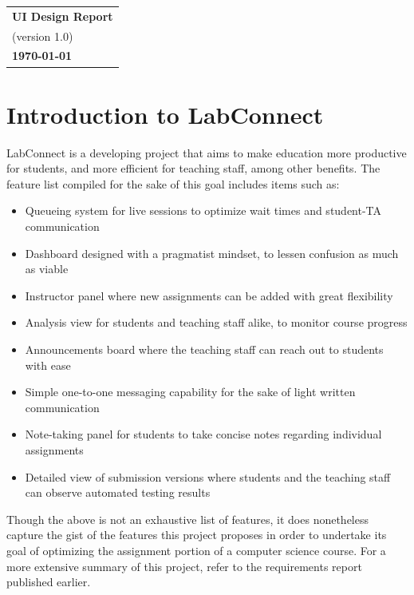 \documentclass[a4paper, 12pt]{article}
\begin{document}
    \begin{table}[h!]
        \renewcommand{\arraystretch}{1.5}
        \centering
        \begin{tabular}{ |>{\centering\arraybackslash}m{15.15cm}| }
            \hline
            \Large \textbf{UI Design Report} \\
            \small (version 1.0) \\
            \small \textbf{\today} \\
            \hline
        \end{tabular}
    \end{table}
    
    
    \section{Introduction to LabConnect}
    
    LabConnect is a developing project that aims to make education more productive for students,
    and more efficient for teaching staff, among other benefits. The feature list compiled for the
    sake of this goal includes items such as:
    \begin{itemize}
        \item Queueing system for live sessions to optimize wait times and student-TA communication
        \item Dashboard designed with a pragmatist mindset, to lessen confusion as much as viable
        \item Instructor panel where new assignments can be added with great flexibility
        \item Analysis view for students and teaching staff alike, to monitor course progress
        \item Announcements board where the teaching staff can reach out to students with ease
        \item Simple one-to-one messaging capability for the sake of light written communication
        \item Note-taking panel for students to take concise notes regarding individual assignments
        \item Detailed view of submission versions where students and the teaching staff can observe
            automated testing results
    \end{itemize}
    
    Though the above is not an exhaustive list of features, it does nonetheless capture the gist of the features
    this project proposes in order to undertake its goal of optimizing the assignment portion of
    a computer science course. For a more extensive summary of this project, refer to the requirements report published earlier.
    
\end{document}
